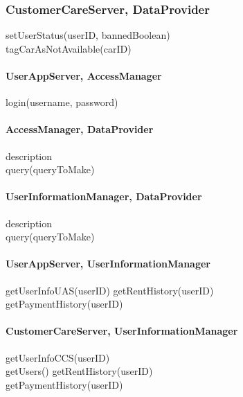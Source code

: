 \subsubsection{CustomerCareServer, DataProvider}
setUserStatus(userID, bannedBoolean) \\
tagCarAsNotAvailable(carID) \\


\paragraph{UserAppServer, AccessManager}
login(username, password) %

\paragraph{AccessManager, DataProvider} 
description \\
query(queryToMake)

\paragraph{UserInformationManager, DataProvider} 
description \\
query(queryToMake)

\paragraph{UserAppServer, UserInformationManager}
getUserInfoUAS(userID)
getRentHistory(userID) \\
getPaymentHistory(userID) \\

\paragraph{CustomerCareServer, UserInformationManager}
getUserInfoCCS(userID) \\
getUsers()
getRentHistory(userID) \\
getPaymentHistory(userID) \\










